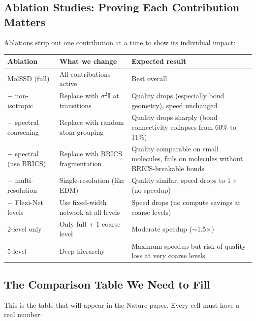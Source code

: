 \documentclass[12pt,a4paper]{article}
\begin{document}
\subsection{Ablation Studies: Proving Each Contribution Matters}

Ablations strip out one contribution at a time to show its individual impact:

\begin{center}
\renewcommand{\arraystretch}{1.25}
\begin{tabular}{lp{5cm}p{5cm}}
\toprule
\textbf{Ablation} & \textbf{What we change} & \textbf{Expected result} \\
\midrule
MolSSD (full) & All contributions active & Best overall \\
$-$ non-isotropic & Replace with $\sigma^2 \bm{I}$ at transitions & Quality drops (especially bond geometry), speed unchanged \\
$-$ spectral coarsening & Replace with random atom grouping & Quality drops sharply (bond connectivity collapses from 60\% to 11\%) \\
$-$ spectral (use BRICS) & Replace with BRICS fragmentation & Quality comparable on small molecules, fails on molecules without BRICS-breakable bonds \\
$-$ multi-resolution & Single-resolution (like EDM) & Quality similar, speed drops to $1\times$ (no speedup) \\
$-$ Flexi-Net levels & Use fixed-width network at all levels & Speed drops (no compute savings at coarse levels) \\
2-level only & Only full + 1 coarse level & Moderate speedup ($\sim$1.5$\times$) \\
5-level & Deep hierarchy & Maximum speedup but risk of quality loss at very coarse levels \\
\bottomrule
\end{tabular}
\end{center}

\subsection{The Comparison Table We Need to Fill}

This is the table that will appear in the Nature paper. Every cell must have a real number:
\end{document}
